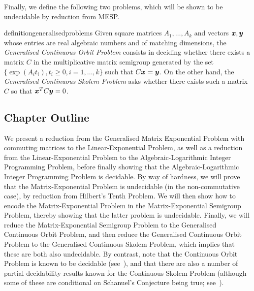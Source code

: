 Finally, we define the following two problems, which will be shown to be undecidable by reduction from MESP.

\begin{restatable}{definition}{generalisedproblems}
  \label{def:generalised-problems}
  Given square matrices $A_{1}, \ldots, A_{k}$ and vectors $\boldsymbol{x}, \boldsymbol{y}$ whose entries are real algebraic numbers and of matching dimensions, the \emph{Generalised Continuous Orbit Problem} consists in deciding whether there exists a matrix $C$ in the multiplicative matrix semigroup generated by the set $\lbrace \exp(A_{i} t_{i}), t_{i} \geq 0, i = 1, \ldots, k \rbrace$ such that $C\boldsymbol{x} = \boldsymbol{y}$. On the other hand, the \emph{Generalised Continuous Skolem Problem} asks whether there exists such a matrix $C$ so that $\boldsymbol{x}^{T} C \boldsymbol{y} = 0$.
\end{restatable}

\subsection{Chapter Outline}

We present a reduction from the Generalised Matrix
Exponential Problem with commuting matrices to the Linear-Exponential
Problem, as well as a reduction from the Linear-Exponential Problem to
the Algebraic-Logarithmic Integer Programming Problem, before finally showing that the Algebraic-Logarithmic Integer Programming Problem is decidable. By way of hardness, we will prove that the Matrix-Exponential Problem is
undecidable (in the non-commutative case), by reduction from Hilbert's
Tenth Problem. We will then show how to encode the Matrix-Exponential Problem in the Matrix-Exponential Semigroup Problem, thereby showing that the latter problem is undecidable. Finally, we will reduce the Matrix-Exponential Semigroup Problem to the Generalised Continuous Orbit Problem, and then reduce the Generalised Continuous Orbit Problem to the Generalised Continuous Skolem Problem, which implies that these are both also undecidable. By contrast, note that the Continuous Orbit Problem is known to be decidable (see~\cite{ContinuousOrbitIPL}), and that there are also a number of partial decidability results known for the Continuous Skolem Problem (although some of these are conditional on Schanuel's Conjecture being true; see~\cite{ContinuousSkolem3}).
